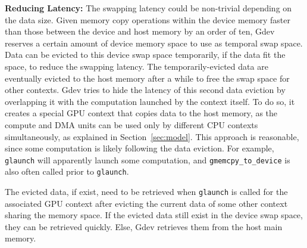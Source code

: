 \textbf{Reducing Latency:}
The swapping latency could be non-trivial depending on the data size.
Given memory copy operations within the device memory faster than
those between the device and host memory by an order of ten, Gdev
reserves a certain amount of device memory space to use as temporal swap
space.
Data can be evicted to this device swap space temporarily, if the data
fit the space, to reduce the swapping latency.
The temporarily-evicted data are eventually evicted to the host memory
after a while to free the swap space for other contexts.
Gdev tries to hide the latency of this second data eviction by
overlapping it with the computation launched by the context itself.
To do so, it creates a special GPU context that copies data to the host
memory, as the compute and DMA units can be used only by different
CPU contexts simultaneously, as explained in Section~\ref{sec:model}.
This approach is reasonable, since some computation is likely following
the data eviction.
For example, \texttt{glaunch} will apparently launch some computation, and
\texttt{gmemcpy\_to\_device} is also often called prior to \texttt{glaunch}.


The evicted data, if exist, need to be retrieved when \texttt{glaunch}
is called for the associated GPU context after evicting the current data
of some other context sharing the memory space.
If the evicted data still exist in the device swap space, they can be
retrieved quickly.
Else, Gdev retrieves them from the host main memory.
